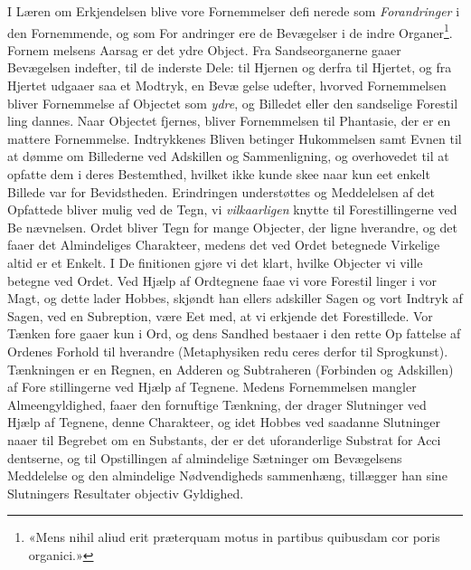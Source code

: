 \documentclass[12pt,a4paper]{book}
\begin{document}
I Læren om Erkjendelsen blive vore Fornemmelser defi\-%
nerede som \emph{Forandringer} i den Fornemmende, og som For\-%
andringer ere de Bevægelser i de indre Organer\footnote{«Mens nihil aliud erit præterquam motus in partibus quibusdam cor\-%
poris organici.»}. Fornem\-%
melsens Aarsag er det ydre Object. Fra Sandseorganerne gaaer
Bevægelsen indefter, til de inderste Dele: til Hjernen og derfra
til Hjertet, og fra Hjertet udgaaer saa et Modtryk, en Bevæ\-%
gelse udefter, hvorved Fornemmelsen bliver Fornemmelse af
Objectet som \emph{ydre}, og Billedet eller den sandselige Forestil\-%
ling dannes. Naar Objectet fjernes, bliver Fornemmelsen til
Phantasie, der er en mattere Fornemmelse. Indtrykkenes
Bliven betinger Hukommelsen samt Evnen til at dømme om
Billederne ved Adskillen og Sammenligning, og overhovedet
til at opfatte dem i deres Bestemthed, hvilket ikke kunde skee
naar kun eet enkelt Billede var for Bevidstheden. Erindringen
understøttes og Meddelelsen af det Opfattede bliver mulig ved
de Tegn, vi \emph{vilkaarligen} knytte til Forestillingerne ved Be\-%
nævnelsen. Ordet bliver Tegn for mange Objecter, der ligne
hverandre, og det faaer det Almindeliges Charakteer, medens
det ved Ordet betegnede Virkelige altid er et Enkelt. I De\-%
finitionen gjøre vi det klart, hvilke Objecter vi ville betegne
ved Ordet. Ved Hjælp af Ordtegnene faae vi vore Forestil\-%
linger i vor Magt, og dette lader Hobbes, skjøndt han ellers
adskiller Sagen og vort Indtryk af Sagen, ved en Subreption,
være Eet med, at vi erkjende det Forestillede. Vor Tænken fore\-%
gaaer kun i Ord, og dens Sandhed bestaaer i den rette Op\-%
fattelse af Ordenes Forhold til hverandre (Metaphysiken redu\-%
ceres derfor til Sprogkunst). Tænkningen er en Regnen, en
Adderen og Subtraheren (Forbinden og Adskillen) af Fore\-%
stillingerne ved Hjælp af Tegnene. Medens Fornemmelsen
mangler Almeengyldighed, faaer den fornuftige Tænkning, der
drager Slutninger ved Hjælp af Tegnene, denne Charakteer,
og idet Hobbes ved saadanne Slutninger naaer til Begrebet
om en Substants, der er det uforanderlige Substrat for Acci\-%
dentserne, og til Opstillingen af almindelige Sætninger om
Bevægelsens Meddelelse og den almindelige Nødvendigheds\-%
sammenhæng, tillægger han sine Slutningers Resultater objectiv
Gyldighed.
\end{document}
